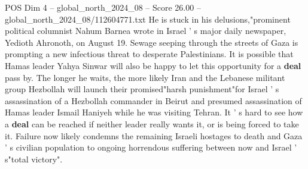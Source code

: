 \begin{textsample}{POS Dim 4 – global\_north\_2024\_08 – Score 26.00 – global\_north\_2024\_08/112604771.txt}
He is stuck in his delusions,"prominent political columnist Nahum Barnea wrote in Israel ' s major daily newspaper, Yedioth Ahronoth, on August 19.
Sewage seeping through the streets of Gaza is prompting a new infectious threat to desperate Palestinians.
It is possible that Hamas leader Yahya Sinwar will also be happy to let this opportunity for a \textbf{deal} pass by.
The longer he waits, the more likely Iran and the Lebanese militant group Hezbollah will launch their promised"harsh punishment"for Israel ' s assassination of a Hezbollah commander in Beirut and presumed assassination of Hamas leader Ismail Haniyeh while he was visiting Tehran.
It ' s hard to see how a \textbf{deal} can be reached if neither leader really wants it, or is being forced to take it.
Failure now likely condemns the remaining Israeli hostages to death and Gaza ' s civilian population to ongoing horrendous suffering between now and Israel ' s"total victory".

\end{textsample}
